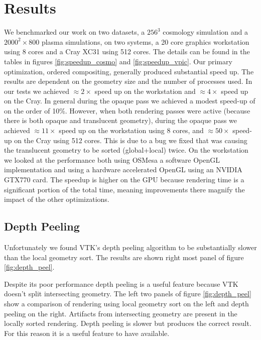 \documentclass[a4paper,10pt]{report}
\begin{document}
\section{Results}
We benchmarked our work on two datasets, a $256^3$ cosmology simulation and a $2000^2 \times 800$ plasma simulations, on two systems, a 20 core graphics workstation using 8 cores and a Cray XC31 using 512 cores. The details can be found in the tables in figures \ref{fig:speedup_cosmo} and \ref{fig:speedup_vpic}. Our primary optimization, ordered compositing, generally produced substantial speed up. The results are dependent on the geometry size and the number of processes used. In our tests we achieved $\approx 2 \times$ speed up on the workstation and $\approx 4 \times$ speed up on the Cray. In general during the opaque pass we achieved a modest speed-up of on the order of 10\%. However, when both rendering passes were active (because there is both opaque and translucent geometry), during the opaque pass we achieved $\approx 11 \times$ speed up on the workstation using 8 cores, and $\approx 50 \times$ speed-up on the Cray using 512 cores. This is due to a bug we fixed that was causing the translucent geometry to be sorted (global+local) twice. On the workstation we looked at the performance both using OSMesa a software OpenGL implementation and using a hardware accelerated OpenGL using an NVIDIA GTX770 card. The speedup is higher on the GPU because rendering time is a significant portion of the total time, meaning improvements there magnify the impact of the other optimizations.

\subsection*{Depth Peeling}
Unfortunately we found VTK's depth peeling algorithm to be substantially slower than the local geometry sort. The results are shown right most panel of figure \ref{fig:depth_peel}. 

Despite its poor performance depth peeling is a useful feature because VTK doesn't split intersecting geometry. The left two panels of figure \ref{fig:depth_peel} show a comparison of rendering using local geometry sort on the left and depth peeling on the right. Artifacts from intersecting geometry are present in the locally sorted rendering. Depth peeling is slower but produces the correct result. For this reason it is a useful feature to have available.
\end{document}
